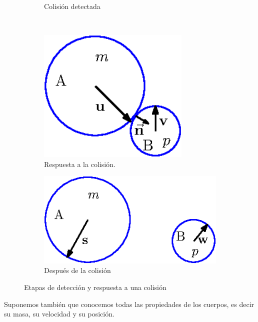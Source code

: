 \begin{figure}
\begin{subfigure}[b]{0.32\textwidth}
    \caption{Colisión detectada}
    \label{fig:coliDetecta}
  \end{subfigure}
\\
\vspace{1cm}
  \begin{subfigure}[b]{0.32\textwidth}
    \includegraphics[width=0.8\textwidth]{Img/02/colisionesResponde}
    \caption{Respuesta a la colisión.}
    \label{fig:coliResponde}
  \end{subfigure}
  \hspace{2cm}
  \begin{subfigure}[b]{0.32\textwidth}
    \includegraphics[width=1.1\textwidth]{Img/02/colisionesAjusta}
    \caption{Después de la colisión}
    \label{fig:coliAjusta}
  \end{subfigure}
 \caption[Colisión elástica]{Etapas de detección y respuesta a una colisión} 
 \label{colision:fig}
\end{figure}

Suponemos también que conocemos todas las propiedades de los cuerpos, es decir su masa, su velocidad y su posición.

